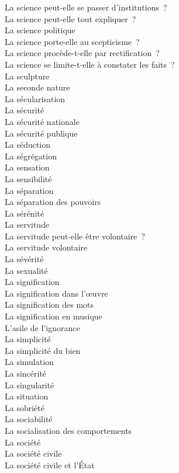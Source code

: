 \documentclass[a4paper,12pt]{article}
\begin{document}
La science peut-elle se passer d'institutions ? \\
La science peut-elle tout expliquer ? \\
La science politique \\
La science porte-elle au scepticisme ? \\
La science procède-t-elle par rectification ? \\
La science se limite-t-elle à constater les faits ? \\
La sculpture \\
La seconde nature \\
La sécularisation \\
La sécurité \\
La sécurité nationale \\
La sécurité publique \\
La séduction \\
La ségrégation \\
La sensation \\
La sensibilité \\
La séparation \\
La séparation des pouvoirs \\
La sérénité \\
La servitude \\
La servitude peut-elle être volontaire ? \\
La servitude volontaire \\
La sévérité \\
La sexualité \\
La signification \\
La signification dans l'œuvre \\
La signification des mots \\
La signification en musique \\
L'asile de l'ignorance \\
La simplicité \\
La simplicité du bien \\
La simulation \\
La sincérité \\
La singularité \\
La situation \\
La sobriété \\
La sociabilité \\
La socialisation des comportements \\
La société \\
La société civile \\
La société civile et l'État \\
\end{document}
